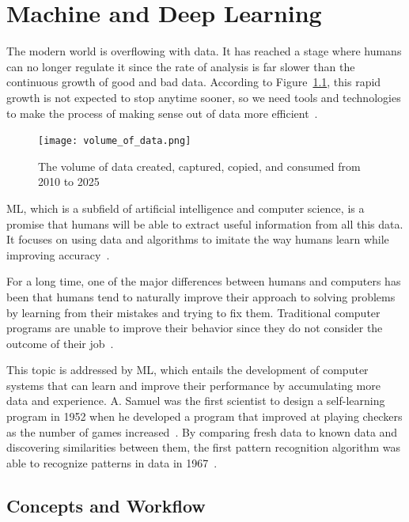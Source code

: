 \chapter{Machine and Deep Learning} \label{sec:ml}

The modern world is overflowing with data. It has reached a stage where humans can no longer regulate it since the rate of analysis is far slower than the continuous growth of good and bad data. According to Figure~\ref{fig:volume_of_data}, this rapid growth is not expected to stop anytime sooner, so we need tools and technologies to make the process of making sense out of data more efficient~\cite{G2017WhatLearning}.

\begin{figure}[htbp]
    \centering
    \texttt{[image: volume\_of\_data.png]}
    \caption{The volume of data created, captured, copied, and consumed from 2010 to 2025~\cite{TotalStatista}}
    \label{fig:volume_of_data}
\end{figure}

\gls{ML}, which is a subfield of artificial intelligence and computer science, is a promise that humans will be able to extract useful information from all this data. It focuses on using data and algorithms to imitate the way humans learn while improving accuracy~\cite{IBMCloudEducationWhatLearning}.

For a long time, one of the major differences between humans and computers has been that humans tend to naturally improve their approach to solving problems by learning from their mistakes and trying to fix them. Traditional computer programs are unable to improve their behavior since they do not consider the outcome of their job~\cite{Luckert2016UsingDocuments}. 

This topic is addressed by \gls{ML}, which entails the development of computer systems that can learn and improve their performance by accumulating more data and experience. A. Samuel was the first scientist to design a self-learning program in 1952 when he developed a program that improved at playing checkers as the number of games increased~\cite{Samuel1959SomeCheckers}. By comparing fresh data to known data and discovering similarities between them, the first pattern recognition algorithm was able to recognize patterns in data in 1967~\cite{Luckert2016UsingDocuments}. 

\section{Concepts and Workflow}

